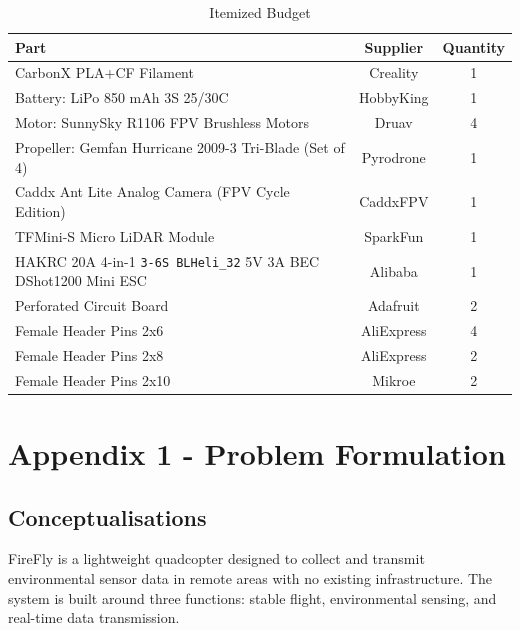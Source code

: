 \documentclass[journal, onecolumn]{IEEEtran}
\begin{document}
\begin{table}[H]
    \centering
    \small
    \begin{tabular}{|l|c|c|}
        \hline
        \textbf{Part} & \textbf{Supplier} & \textbf{Quantity} \\
        \hline
        CarbonX PLA+CF Filament & Creality & 1 \\
        \hline
        Battery: LiPo 850 mAh 3S 25/30C & HobbyKing & 1 \\
        \hline
        Motor: SunnySky R1106 FPV Brushless Motors & Druav & 4 \\
        \hline
        Propeller: Gemfan Hurricane 2009-3 Tri-Blade (Set of 4) & Pyrodrone & 1 \\
        \hline
        Caddx Ant Lite Analog Camera (FPV Cycle Edition) & CaddxFPV & 1 \\
        \hline
        TFMini-S Micro LiDAR Module & SparkFun & 1 \\
        \hline
        HAKRC 20A 4-in-1 \verb|3-6S BLHeli_32| 5V 3A BEC DShot1200 Mini ESC & Alibaba & 1 \\
        \hline
        Perforated Circuit Board & Adafruit & 2 \\
        \hline
        Female Header Pins 2x6 & AliExpress & 4 \\
        \hline
        Female Header Pins 2x8 & AliExpress & 2 \\
        \hline
        Female Header Pins 2x10 & Mikroe & 2 \\
        \hline
    \end{tabular}
    \caption{Itemized Budget}
    \label{tab:budget}
\end{table}

\newpage

\section{Appendix 1 - Problem Formulation}

\subsection{Conceptualisations}

FireFly is a lightweight quadcopter designed to collect and transmit 
environmental sensor data in remote areas with no existing infrastructure. 
The system is built around three functions: stable flight, environmental 
sensing, and real-time data transmission.
\end{document}
